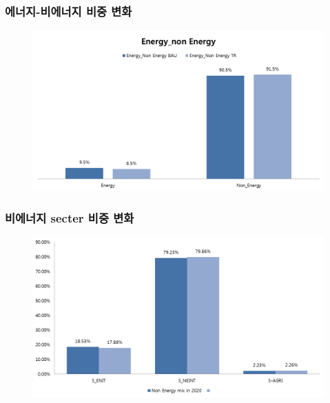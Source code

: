 \documentclass[10pt,compress,slidetop,%
			   hyperref={unicode},xcolor={svgnames},%
			   t]{beamer}
\begin{document}
\begin{frame}
	\frametitle{에너지-비에너지 비중 변화}
	\begin{figure}
		\centering
		\includegraphics[width=1.00\textwidth]{EandNE.png}
	\end{figure}
\end{frame}

\begin{frame}
	\frametitle{비에너지 secter 비중 변화}
	\begin{figure}
		\centering
		\includegraphics[width=1.00\textwidth]{NEmix.png}
	\end{figure}
\end{frame}
\end{document}
